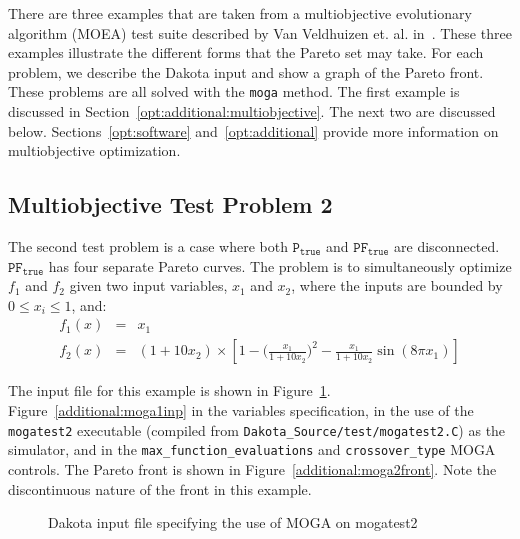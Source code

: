 There are three examples that are taken from a multiobjective 
evolutionary algorithm (MOEA) test suite described by Van Veldhuizen
et. al. in~\cite{Coe02}. These three examples 
illustrate the different forms that the Pareto set may take. For each
problem, we describe the Dakota input and show a graph of the Pareto
front. These problems are all solved with the \texttt{moga} method.
The first example is discussed in Section~\ref{opt:additional:multiobjective}. 
The next two are discussed below. 
Sections~\ref{opt:software} and~\ref{opt:additional} provide more
information on multiobjective optimization.

\subsection{Multiobjective Test Problem 2}\label{additional:multiobjective:problem2}

The second test problem is a case where both $\mathtt{P_{true}}$ and
$\mathtt{PF_{true}}$ are disconnected. $\mathtt{PF_{true}}$ has four
separate Pareto curves. The problem is to simultaneously optimize
$f_1$ and $f_2$ given two input variables, $x_1$ and $x_2$,
where the inputs are bounded by $0 \leq x_{i} \leq 1$, and:
\begin{eqnarray*}
f_1(x) &=& x_1 \\
f_2(x) &=& (1+10x_2) \times \left[1-\bigg(\frac{x_1}{1+10x_2}\bigg)^2-
\frac{x_1}{1+10x_2}\sin(8\pi x_1)\right]
\end{eqnarray*}

The input file for this example is shown in
Figure~\ref{additional:moga2inp}.
Figure~\ref{additional:moga1inp} in the variables specification, in
the use of the \texttt{mogatest2} executable (compiled from
\texttt{Dakota\_Source/test/mogatest2.C}) as the simulator, and in the
\texttt{max\_function\_evaluations} and \texttt{crossover\_type} MOGA
controls. The Pareto front is shown in
Figure~\ref{additional:moga2front}. Note the discontinuous nature of
the front in this example.

\begin{figure}
  \centering
  \begin{bigbox}
    \begin{small}
    \end{small}
  \end{bigbox}
  \caption{Dakota input file specifying the use of MOGA on mogatest2}
  \label{additional:moga2inp}
\end{figure}

